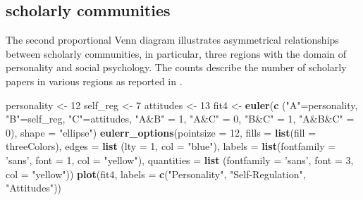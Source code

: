 \documentclass[
  openany]{book}
\newenvironment{Shaded}{\begin{snugshade}}{\end{snugshade}}
\newcommand{\DataTypeTok}[1]{\textcolor[rgb]{0.13,0.29,0.53}{#1}}
\newcommand{\DecValTok}[1]{\textcolor[rgb]{0.00,0.00,0.81}{#1}}
\newcommand{\KeywordTok}[1]{\textcolor[rgb]{0.13,0.29,0.53}{\textbf{#1}}}
\newcommand{\NormalTok}[1]{#1}
\newcommand{\StringTok}[1]{\textcolor[rgb]{0.31,0.60,0.02}{#1}}
\begin{document}
\hypertarget{scholarly-communities}{%
\subsection{scholarly communities}\label{scholarly-communities}}

The second proportional Venn diagram illustrates asymmetrical relationships between scholarly communities, in particular, three regions with the domain of personality and social psychology. The counts describe the number of scholarly papers in various regions as reported in \citet{lanning2017relationship}.

\begin{Shaded}
\begin{Highlighting}[]
\NormalTok{    personality <-}\StringTok{ }\DecValTok{12}
\NormalTok{    self_reg <-}\StringTok{ }\DecValTok{7}
\NormalTok{    attitudes <-}\StringTok{ }\DecValTok{13}
\NormalTok{    fit4 <-}\StringTok{ }\KeywordTok{euler}\NormalTok{(}\KeywordTok{c}\NormalTok{ (}\StringTok{"A"}\NormalTok{=personality,}
                     \StringTok{"B"}\NormalTok{=self_reg,}
                     \StringTok{"C"}\NormalTok{=attitudes,}
                     \StringTok{"A&B"}\NormalTok{ =}\StringTok{ }\DecValTok{1}\NormalTok{,}
                     \StringTok{"A&C"}\NormalTok{ =}\StringTok{ }\DecValTok{0}\NormalTok{,}
                     \StringTok{"B&C"}\NormalTok{ =}\StringTok{ }\DecValTok{1}\NormalTok{,}
                     \StringTok{"A&B&C"}\NormalTok{ =}\StringTok{ }\DecValTok{0}\NormalTok{), }
                  \DataTypeTok{shape =} \StringTok{"ellipse"}\NormalTok{)}
    \KeywordTok{eulerr_options}\NormalTok{(}\DataTypeTok{pointsize =} \DecValTok{12}\NormalTok{,}
                   \DataTypeTok{fills =} \KeywordTok{list}\NormalTok{(}\DataTypeTok{fill =}\NormalTok{ threeColors),}
                   \DataTypeTok{edges =} \KeywordTok{list}\NormalTok{ (}\DataTypeTok{lty =} \DecValTok{1}\NormalTok{, }\DataTypeTok{col =} \StringTok{"blue"}\NormalTok{),}
                   \DataTypeTok{labels =} \KeywordTok{list}\NormalTok{(}\DataTypeTok{fontfamily =} \StringTok{'sans'}\NormalTok{,}
                                 \DataTypeTok{font =} \DecValTok{1}\NormalTok{,}
                                 \DataTypeTok{col =} \StringTok{"yellow"}\NormalTok{),}
                   \DataTypeTok{quantities =} \KeywordTok{list}\NormalTok{ (}\DataTypeTok{fontfamily =} \StringTok{'sans'}\NormalTok{,}
                                      \DataTypeTok{font =} \DecValTok{3}\NormalTok{,}
                                      \DataTypeTok{col =} \StringTok{"yellow"}\NormalTok{))}
    \KeywordTok{plot}\NormalTok{(fit4, }
              \DataTypeTok{labels =} \KeywordTok{c}\NormalTok{(}\StringTok{"Personality"}\NormalTok{,}
                         \StringTok{"Self-Regulation"}\NormalTok{,}
                         \StringTok{"Attitudes"}\NormalTok{))}
\end{Highlighting}
\end{Shaded}
\end{document}
